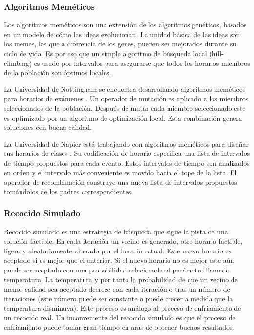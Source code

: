 \subsubsection{Algoritmos Mem\'eticos}

Los algoritmos mem\'eticos son una extensión de los algoritmos gen\'eticos, basados en un modelo de cómo las ideas evolucionan. La unidad básica de las ideas son los memes, los que a diferencia de los genes, pueden ser mejorados durante su ciclo de vida. Es por eso que un simple algoritmo de búsqueda local (hill-climbing) es usado por intervalos
para asegurarse que todos los horarios miembros de la población son óptimos locales.

La Universidad de Nottingham se encuentra desarrollando algoritmos mem\'eticos para horarios de exámenes \cite{EK Burke and JP Newall and RF Weare}. Un operador de mutación es aplicado a los miembros seleccionados de la población. Despu\'es de mutar cada miembro seleccionado este es optimizado por un algoritmo de optimización local. Esta combinación genera soluciones con buena calidad.

La Universidad de Napier está trabajando con algoritmos mem\'eticos para diseñar sus horarios de clases \cite{B Paechter and A Cumming and MG Norman and H Luchian}. Su codificación de horario especifica una lista de intervalos de tiempo propuestos para cada evento. Estos intervalos de tiempo son analizados en orden y el intervalo más conveniente es movido hacia el tope de la lista. El operador de recombinación construye una nueva lista de intervalos propuestos tomándolos de los padres correspondientes.

\subsubsection{Recocido Simulado}

Recocido simulado es una estrategia de búsqueda que sigue la pista de una solución factible. En cada iteración un vecino es generado, otro horario factible, ligero y aleatoriamente alterado por el horario actual. Este nuevo horario es aceptado si es mejor que el anterior. Si el nuevo horario no es mejor este aún puede ser aceptado con una probabilidad relacionada al parámetro llamado temperatura. La temperatura y por tanto la probabilidad de que un vecino de menor calidad sea aceptado decrece con cada iteración o tras un número de iteraciones (este número puede ser constante o puede crecer a medida que la temperatura disminuya). Este proceso es análogo al proceso de enfriamiento de un recocido real. Un inconveniente del recocido simulado es que el proceso de enfriamiento puede tomar gran tiempo en aras de obtener buenos resultados.

